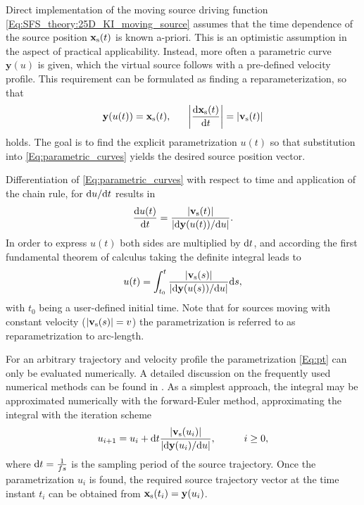 Direct implementation of the moving source driving function \eqref{Eq:SFS_theory:25D_KI_moving_source} assumes that the time dependence of the source position $\mathbf{x}_{\mathrm{s}}(t)$ is known a-priori. 
This is an optimistic assumption in the aspect of practical applicability. 
Instead, more often a parametric curve $\mathbf{y}(u)$ is given, which the virtual source follows with a pre-defined velocity profile.
This requirement can be formulated as finding a reparameterization, so that 
\begin{equation}
\mathbf{y}(u(t)) = \mathbf{x}_{\mathrm{s}}(t), \hspace{6mm} \left| \frac{\mathrm{d} \mathbf{x}_{\mathrm{s}}(t)}{\mathrm{d} t} \right| = |\mathbf{v}_{\mathrm{s}}(t)| 
\label{Eq:parametric_curves}
\end{equation}
holds. 
The goal is to find the explicit parametrization $u(t)$ so that substitution into \eqref{Eq:parametric_curves} yields the desired source position vector.

Differentiation of \eqref{Eq:parametric_curves} with respect to time and application of the chain rule, for $\mathrm{d} u / \mathrm{d} t$ results in
%
\begin{equation}
 \frac{\mathrm{d} u(t) }{\mathrm{d} t} = \frac{|\mathbf{v}_{\mathrm{s}}(t)|}{\left| \mathrm{d} \mathbf{y}(u(t)) / \mathrm{d} u \right|}.
\end{equation}
In order to express $u(t)$ both sides are multiplied by $\mathrm{d} t$, and according the first fundamental theorem of calculus taking the definite integral leads to
\begin{equation}
u(t) = \int_{t_0}^{t} \frac{|\mathbf{v}_{\mathrm{s}}(s)|}{\left| \mathrm{d} \mathbf{y}(u(s)) / \mathrm{d} u \right|} \mathrm{d} s,
\label{Eq:pt}
\end{equation}
with $t_0$ being a user-defined initial time.
Note that for sources moving with constant velocity ($|\mathbf{v}_{\mathrm{s}}(s)| = v$) the parametrization is referred to as reparametrization to arc-length.

For an arbitrary trajectory and velocity profile the parametrization \eqref{Eq:pt} can only be evaluated numerically.
A detailed discussion on the frequently used numerical methods can be found in \cite{Parent2012}.
As a simplest approach, the integral may be approximated numerically with the forward-Euler method, approximating the integral with the iteration scheme
\begin{equation}
u_{i+1} = u_i + \td t \frac{|\vvs(u_i)|}{ | \td \mathbf{y}(u_i)/\td u | }, \hspace{10mm} i \geq 0,
\end{equation}
where $\mathrm{d} t = \frac{1}{fs}$ is the sampling period of the source trajectory.
Once the parametrization $u_i$ is found, the required source trajectory vector at the time instant $t_i$ can be obtained from $\mathbf{x}_{\mathrm{s}}(t_i) = \mathbf{y}(u_i)$. 

